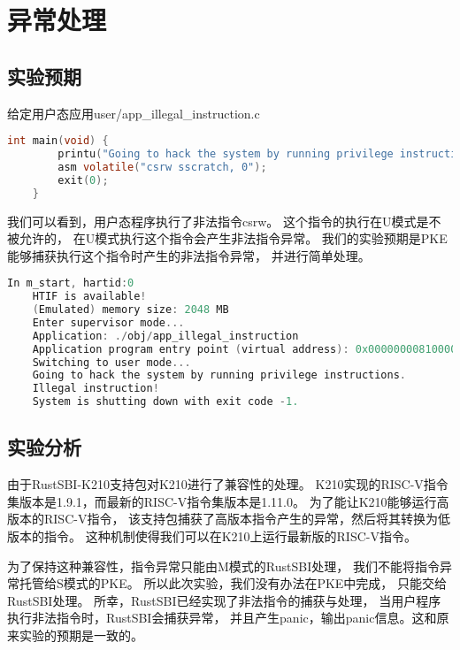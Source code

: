 \section{异常处理}

\subsection{实验预期}

给定用户态应用user/app\_illegal\_instruction.c

\begin{lstlisting}[caption={用户态应用app\_illegal\_instruction.c}, label={lst:app_illegal_instruction}, language=C]
    int main(void) {
        printu("Going to hack the system by running privilege instructions.\n");
        asm volatile("csrw sscratch, 0");
        exit(0);
    }
\end{lstlisting}

我们可以看到，用户态程序执行了非法指令csrw。
这个指令的执行在U模式是不被允许的，
在U模式执行这个指令会产生非法指令异常。
我们的实验预期是PKE能够捕获执行这个指令时产生的非法指令异常，
并进行简单处理。

\begin{lstlisting}[caption={lab2实验结果（移植K210前）}, label={lst:lab2_result_before}, language=C]
    In m_start, hartid:0
    HTIF is available!
    (Emulated) memory size: 2048 MB
    Enter supervisor mode...
    Application: ./obj/app_illegal_instruction
    Application program entry point (virtual address): 0x0000000081000000
    Switching to user mode...
    Going to hack the system by running privilege instructions.
    Illegal instruction!
    System is shutting down with exit code -1.    
\end{lstlisting}

\subsection{实验分析}

由于RustSBI-K210支持包对K210进行了兼容性的处理。
K210实现的RISC-V指令集版本是1.9.1，而最新的RISC-V指令集版本是1.11.0。
为了能让K210能够运行高版本的RISC-V指令，
该支持包捕获了高版本指令产生的异常，然后将其转换为低版本的指令。
这种机制使得我们可以在K210上运行最新版的RISC-V指令。

为了保持这种兼容性，指令异常只能由M模式的RustSBI处理，
我们不能将指令异常托管给S模式的PKE。
所以此次实验，我们没有办法在PKE中完成，
只能交给RustSBI处理。
所幸，RustSBI已经实现了非法指令的捕获与处理，
当用户程序执行非法指令时，RustSBI会捕获异常，
并且产生panic，输出panic信息。这和原来实验的预期是一致的。

